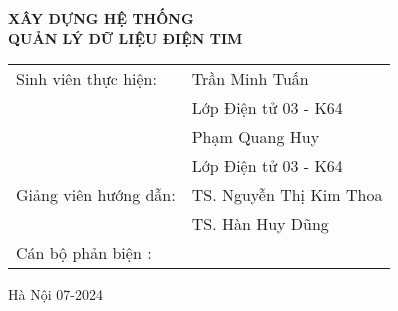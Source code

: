   \begin{center}
     \textbf{\fontsize{20pt}{0pt}\selectfont XÂY DỰNG HỆ THỐNG } \\
     \textbf{\fontsize{20pt}{0pt}\selectfont QUẢN LÝ DỮ LIỆU ĐIỆN TIM }
  
  \vspace{1.5cm}
  \begin{table}[H]
       \centering
       
       \begin{tabular}{l l}
            \fontsize{14pt}{0pt}\selectfont Sinh viên thực hiện:      & \fontsize{14pt}{0pt}\selectfont Trần Minh Tuấn \\
            &\fontsize{14pt}{0pt}\selectfont Lớp Điện tử 03 - K64 \vspace{6pt} \\
            &\fontsize{14pt}{0pt}\selectfont Phạm Quang Huy  \\
            &\fontsize{14pt}{0pt}\selectfont Lớp Điện tử 03 - K64 \vspace{6pt} \\
            \fontsize{14pt}{0pt}\selectfont Giảng viên hướng dẫn: & \fontsize{14pt}{0pt}\selectfont TS. Nguyễn Thị Kim Thoa  \vspace{6pt} \\  
              &\fontsize{14pt}{0pt}\selectfont TS. Hàn Huy Dũng \vspace{6pt} \\
            \fontsize{14pt}{0pt}\selectfont Cán bộ phản biện : &
       \end{tabular}
  \end{table}
  \vspace{0.4cm} %
  \fontsize{14pt}{0pt}\selectfont Hà Nội 07-2024
  \end{center}
  
  \cleardoublepage %
  